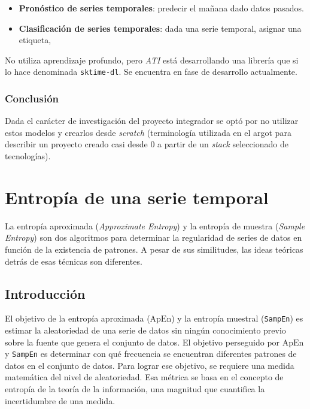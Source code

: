 \documentclass[a4paper,12pt]{article}
\begin{document}
\begin{itemize}[noitemsep, topsep=2pt]
	\item \textbf{Pronóstico de series temporales}: predecir el mañana dado datos pasados.
	\item \textbf{Clasificación de series temporales}: dada una serie temporal, asignar una etiqueta,
\end{itemize}

No utiliza aprendizaje profundo, pero \textit{ATI} está desarrollando una librería que si lo hace denominada \texttt{sktime-dl}. Se encuentra en fase de desarrollo actualmente.

\subsubsection{Conclusión}

Dada el carácter de investigación del proyecto integrador se optó por no utilizar estos modelos y crearlos desde \textit{scratch} (terminología utilizada en el argot para describir un proyecto creado casi desde 0 a partir de un \textit{stack} seleccionado de tecnologías).

\section{Entropía de una serie temporal} \label{sec:entropy}
La entropía aproximada (\textit{Approximate Entropy}) y la entropía de muestra (\textit{Sample Entropy}) son dos algoritmos para determinar la regularidad de series de datos en función de la existencia de patrones. A pesar de sus similitudes, las ideas teóricas detrás de esas técnicas son diferentes. \citep{delgado2019approximate}

\subsection{Introducción}
El objetivo de la entropía aproximada ($\textrm{ApEn}$) y la entropía muestral (\texttt{SampEn}) es estimar la aleatoriedad de una serie de datos sin ningún conocimiento previo sobre la fuente que genera el conjunto de datos. El objetivo perseguido por $\textrm{ApEn}$ y \texttt{SampEn} es determinar con qué frecuencia se encuentran diferentes patrones de datos en el conjunto de datos. Para lograr ese objetivo, se requiere una medida matemática del nivel de aleatoriedad. Esa métrica se basa en el concepto de entropía de la teoría de la información, una magnitud que cuantifica la incertidumbre de una medida.
\end{document}
